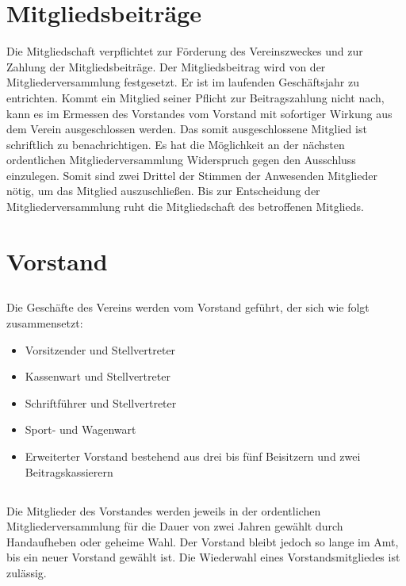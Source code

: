 \section{Mitgliedsbeiträge}	\label{14}
Die Mitgliedschaft verpflichtet zur Förderung des Vereinszweckes und zur Zahlung der Mitgliedsbeiträge. Der Mitgliedsbeitrag wird von der Mitgliederversammlung festgesetzt.
Er ist im laufenden Geschäftsjahr zu entrichten. Kommt ein Mitglied seiner Pflicht zur Beitragszahlung nicht nach, kann es im Ermessen des Vorstandes vom Vorstand mit sofortiger Wirkung aus dem Verein ausgeschlossen werden. Das somit ausgeschlossene Mitglied ist schriftlich zu benachrichtigen. Es hat die Möglichkeit an der nächsten ordentlichen Mitgliederversammlung Widerspruch gegen den Ausschluss einzulegen. Somit sind zwei Drittel der Stimmen der Anwesenden Mitglieder nötig, um das Mitglied auszuschließen. Bis zur Entscheidung der Mitgliederversammlung ruht die Mitgliedschaft des betroffenen Mitglieds. 

\section{Vorstand}
	\subsection {} Die Geschäfte des Vereins werden vom Vorstand geführt, der sich wie folgt zusammensetzt:
	\begin{itemize}
		\item Vorsitzender und Stellvertreter 
		\item Kassenwart und Stellvertreter
		\item Schriftführer und Stellvertreter 
		\item Sport- und Wagenwart
		\item Erweiterter Vorstand bestehend aus drei bis fünf Beisitzern und zwei Beitragskassierern  
	\end{itemize} 
	
	\subsection {}  Die Mitglieder des Vorstandes werden jeweils in der ordentlichen Mitgliederversammlung für die Dauer von zwei Jahren gewählt durch Handaufheben oder geheime Wahl. Der Vorstand bleibt jedoch so lange im Amt, bis ein neuer Vorstand gewählt ist. Die Wiederwahl eines Vorstandsmitgliedes ist zulässig. 
	
